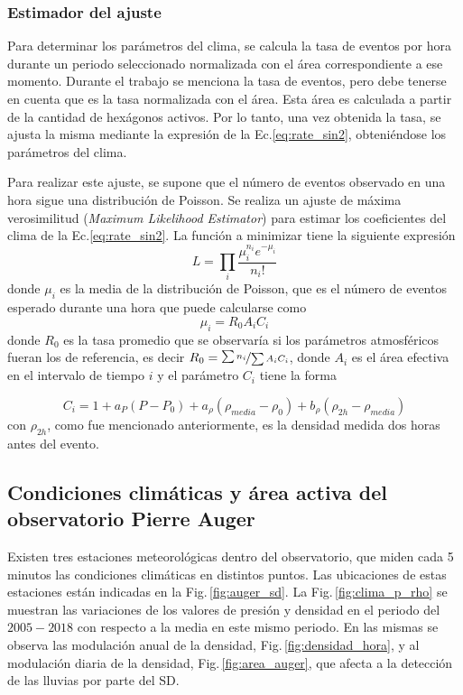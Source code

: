 \subsubsection{Estimador del ajuste}

Para determinar los parámetros del clima, se calcula la tasa de eventos por hora durante un periodo seleccionado normalizada con el área correspondiente a ese momento. Durante el trabajo se menciona la tasa de eventos, pero debe tenerse en cuenta que es la tasa normalizada con el área. Esta área es calculada a partir de la cantidad de hexágonos activos. Por lo tanto, una vez obtenida la tasa, se ajusta la misma mediante la expresión de la Ec.\ref{eq:rate_sin2}, obteniéndose los parámetros del clima.

Para realizar este ajuste, se supone que el número de eventos observado en una hora sigue una distribución de Poisson. Se realiza un ajuste de máxima verosimilitud (\emph{Maximum Likelihood Estimator}) para estimar los coeficientes del clima de la Ec.\ref{eq:rate_sin2}. La función a minimizar tiene la siguiente expresión 
\begin{equation}
	L=\prod_i\frac{\mu_i^{n_i} e^{-\mu_i}}{n_i!}
\end{equation}
donde $\mu_i$ es la media de la distribución de Poisson, que es el número de eventos esperado durante una hora que puede calcularse como
\begin{equation}
	\mu_i = R_0A_iC_i
\end{equation}
donde $R_0$ es la tasa promedio que se observaría si los parámetros atmosféricos fueran los de referencia, es decir $R_0=\nicefrac{\sum n_i}{\sum A_iC_i}$, donde $A_i$ es el área efectiva en el intervalo de tiempo $i$ y el parámetro $C_i$ tiene la forma

\begin{equation}
	C_i = 1+a_P(P-P_0) +a_{\rho}(\rho_{media}-\rho_0) + b_{\rho}(\rho_{2h}-\rho_{media}) 
\end{equation}
con $\rho_{2h}$, como fue mencionado anteriormente, es la densidad medida dos horas antes del evento.

\subsection{Condiciones climáticas y área activa del observatorio Pierre Auger}

Existen tres estaciones meteorológicas dentro del observatorio, que miden cada 5 minutos las condiciones climáticas en distintos puntos. Las ubicaciones de estas estaciones están indicadas en la Fig.\,\ref{fig:auger_sd}. La Fig.\,\ref{fig:clima_p_rho} se muestran las variaciones de los valores de presión y densidad en el periodo del $2005-2018$ con respecto a la media en este mismo periodo. En las mismas se observa las modulación anual de la densidad, Fig.\,\ref{fig:densidad_hora}, y al modulación diaria de la densidad, Fig.\,\ref{fig:area_auger}, que afecta a la detección de las lluvias por parte del SD. 

